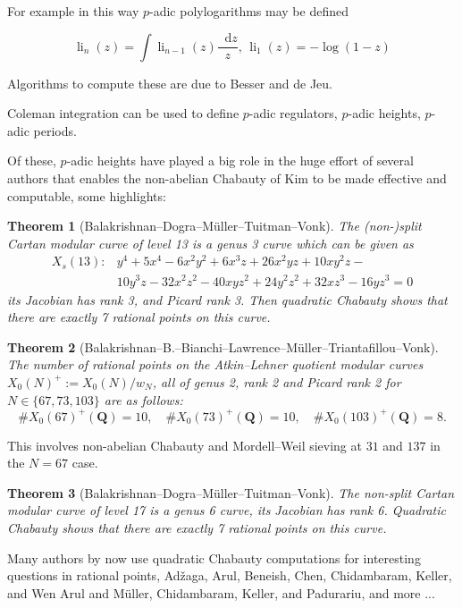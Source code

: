 \documentclass[oneside,11pt,]{article}
\newtheorem{theorem}{Theorem}
\newcommand{\diff}{\mathop{}\!\mathrm{d}}
\newcommand{\QQ}{\mathbf{Q}}
\let\emph\relax %
\DeclareMathOperator{\polylog}{li}
\begin{document}
For example in this way $p$-adic polylogarithms may be defined

$$
\polylog_n (z) = \int \polylog_{n-1}(z) \frac{\diff z}{z},\, \polylog_1(z) = -\log(1-z)
$$

Algorithms to compute these are due to Besser and de Jeu.



\emph{Applications of this theory:}

Coleman integration can be used to define $p$-adic regulators, $p$-adic heights, $p$-adic periods.

Of these, $p$-adic heights have played a big role in the huge effort of several authors that enables the non-abelian Chabauty of Kim to be made effective and computable, some highlights:

\begin{theorem}[Balakrishnan–Dogra–M\"uller–Tuitman–Vonk]
    The (non-)split Cartan modular curve of level 13 is a genus 3 curve which can be given as
    \[\begin{aligned}
        X_s (13) \colon  &y^{4}+5 x^{4}-6 x^{2} y^{2}+6 x^{3} z+26 x^{2} y z+10 x y^{2} z- \\
&10 y^{3} z-32 x^{2} z^{2}-40 x y z^{2}+24 y^{2} z^{2}+32 x z^{3}-16 y z^{3}=0
    \end{aligned}\]
its Jacobian has rank 3, and Picard rank 3.
Then quadratic Chabauty shows that there are exactly 7 rational points on this curve.
\end{theorem}

\begin{theorem}[Balakrishnan--B.--Bianchi--Lawrence--Müller--Triantafillou--Vonk]
The number of rational points on the Atkin--Lehner quotient modular curves $X_0(N)^+ := X_0(N)/w_N$, all of genus 2, rank 2 and Picard rank 2 for $N\in \{67, 73, 103\}$ are as follows:
\[ \#X_0(67)^+(\QQ) = 10,\quad \#X_0(73)^+(\QQ) = 10,\quad \#X_0(103)^+(\QQ) = 8.\]
\end{theorem}

This involves non-abelian Chabauty and Mordell--Weil sieving at $31$ and $137$ in the $N=67$ case.

\begin{theorem}[Balakrishnan–Dogra–M\"uller–Tuitman–Vonk]
The non-split Cartan modular curve of level 17 is a genus 6 curve, its Jacobian has rank 6.
Quadratic Chabauty shows that there are exactly 7 rational points on this curve.
\end{theorem}

Many authors by now use quadratic Chabauty computations for interesting questions in rational points,
Adžaga, Arul, Beneish, Chen, Chidambaram, Keller, and Wen
Arul and Müller, Chidambaram, Keller, and Padurariu, and more ...
\end{document}

